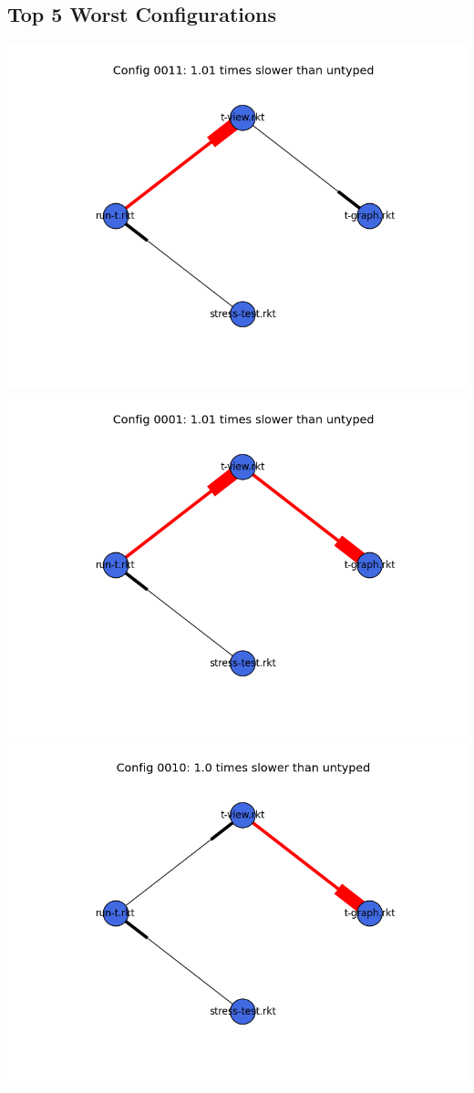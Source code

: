 \documentclass{article}
\begin{document}
\begin{itemize}
\subsection{Top 5 Worst Configurations}
\includegraphics[width=\textwidth]{mbta-2015-03-26-module-graph-0011.png}
\includegraphics[width=\textwidth]{mbta-2015-03-26-module-graph-0001.png}
\includegraphics[width=\textwidth]{mbta-2015-03-26-module-graph-0010.png}

\end{itemize}
\end{document}
